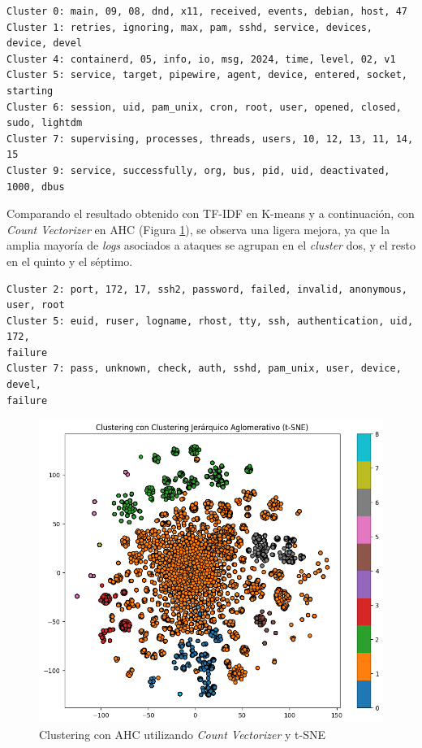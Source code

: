 \begin{mdframed}
\scriptsize
\begin{verbatim}
Cluster 0: main, 09, 08, dnd, x11, received, events, debian, host, 47
Cluster 1: retries, ignoring, max, pam, sshd, service, devices, device, devel
Cluster 4: containerd, 05, info, io, msg, 2024, time, level, 02, v1
Cluster 5: service, target, pipewire, agent, device, entered, socket, starting
Cluster 6: session, uid, pam_unix, cron, root, user, opened, closed, sudo, lightdm
Cluster 7: supervising, processes, threads, users, 10, 12, 13, 11, 14, 15
Cluster 9: service, successfully, org, bus, pid, uid, deactivated, 1000, dbus
\end{verbatim}
\end{mdframed}

Comparando el resultado obtenido con \gls{TF}-\gls{IDF} en K-means y a continuación, con \textit{Count Vectorizer} en \gls{AHC} (Figura \ref{fig:k-means-count-vectorizer-t-sne}), se observa una ligera mejora, ya que la amplia mayoría de \textit{logs} asociados a ataques se agrupan en el \textit{cluster} dos, y el resto en el quinto y el séptimo.

\begin{mdframed}
\scriptsize
\begin{verbatim}
Cluster 2: port, 172, 17, ssh2, password, failed, invalid, anonymous, user, root
Cluster 5: euid, ruser, logname, rhost, tty, ssh, authentication, uid, 172, 
failure
Cluster 7: pass, unknown, check, auth, sshd, pam_unix, user, device, devel,
failure
\end{verbatim}
\end{mdframed}

\begin{figure}[H]
    \centering
    \includegraphics[width=0.7\linewidth]{imagenes/AHC-count-vectorizer-t-sne.png}
    \caption{Clustering con \gls{AHC} utilizando \textit{Count Vectorizer} y \gls{t-SNE}}
    \label{fig:k-means-count-vectorizer-t-sne}
\end{figure}

